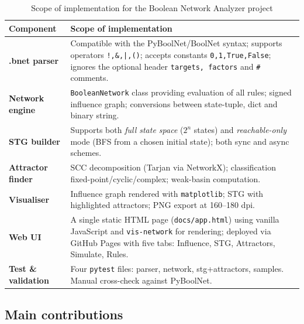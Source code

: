 \documentclass[oneside,final]{hcmut-report}
\begin{document}
\begin{table}[H]
    \centering
    \renewcommand{\arraystretch}{1.4}
    \begin{tabular}{|p{}|p{}|}
        \hline
        \rowcolor{bklight}\textbf{Component} & \textbf{Scope of implementation} \\
        \hline
        \textbf{.bnet parser} & Compatible with the PyBoolNet/BoolNet syntax; supports operators \texttt{!,\&,|,()}; accepts constants \texttt{0,1,True,False}; ignores the optional header \texttt{targets, factors} and \texttt{\#} comments. \\
        \hline
        \textbf{Network engine} & \texttt{BooleanNetwork} class providing evaluation of all rules; signed influence graph; conversions between state-tuple, dict and binary string. \\
        \hline
        \textbf{STG builder} & Supports both \textit{full state space} ($2^n$ states) and \textit{reachable-only} mode (BFS from a chosen initial state); both sync and async schemes. \\
        \hline
        \textbf{Attractor finder} & SCC decomposition (Tarjan via NetworkX); classification fixed-point/cyclic/complex; weak-basin computation. \\
        \hline
        \textbf{Visualiser} & Influence graph rendered with \texttt{matplotlib}; STG with highlighted attractors; PNG export at 160--180 dpi. \\
        \hline
        \textbf{Web UI} & A single static HTML page (\texttt{docs/app.html}) using vanilla JavaScript and \texttt{vis-network} for rendering; deployed via GitHub Pages with five tabs: Influence, STG, Attractors, Simulate, Rules. \\
        \hline
        \textbf{Test \& validation} & Four \texttt{pytest} files: parser, network, stg+attractors, samples. Manual cross-check against PyBoolNet. \\
        \hline
    \end{tabular}
    \caption{Scope of implementation for the Boolean Network Analyzer project}
    \label{tab:scope}
\end{table}

\subsection{Main contributions}\label{subsec:contributions}
\end{document}
